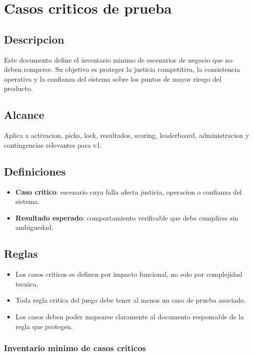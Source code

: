 \section{Casos criticos de prueba}

\subsection{Descripcion}

Este documento define el inventario minimo de escenarios de negocio que no deben romperse. Su objetivo es proteger la justicia competitiva, la consistencia operativa y la confianza del sistema sobre los puntos de mayor riesgo del producto.

\subsection{Alcance}

Aplica a activacion, picks, lock, resultados, scoring, leaderboard, administracion y contingencias relevantes para v1.

\subsection{Definiciones}

\begin{itemize}
  \item \textbf{Caso critico}: escenario cuya falla afecta justicia, operacion o confianza del sistema.
  \item \textbf{Resultado esperado}: comportamiento verificable que debe cumplirse sin ambiguedad.
\end{itemize}

\subsection{Reglas}

\begin{itemize}
  \item Los casos criticos se definen por impacto funcional, no solo por complejidad tecnica.
  \item Toda regla critica del juego debe tener al menos un caso de prueba asociado.
  \item Los casos deben poder mapearse claramente al documento responsable de la regla que protegen.
\end{itemize}

\subsubsection{Inventario minimo de casos criticos}

